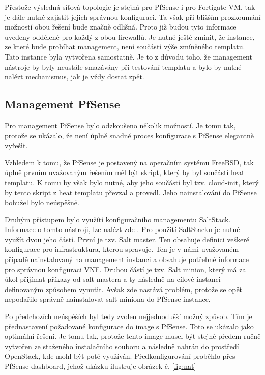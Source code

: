 Přestože výsledná síťová topologie je stejná pro PfSense i pro Fortigate VM, tak je dále nutné zajistit jejich správnou konfiguraci. Ta však při bližším prozkoumání možností obou řešení bude značně odlišná. Proto již budou tyto informace uvedeny odděleně pro každý z obou firewallů. Je nutné ještě zmínit, že instance, ze které bude probíhat management, není součástí výše zmíněného templatu. Tato instance byla vytvořena samostatně. Je to z důvodu toho, že management nástroje by byly neustále smazávány při testování templatu a bylo by nutné nalézt mechanismus, jak je vždy dostat zpět. 

\subsection{Management PfSense}\label{sub:interaction}

Pro management PfSense bylo odzkoušeno několik možností. Je tomu tak, protože se ukázalo, že není úplně snadné proces konfigurace s PfSense elegantně vyřešit. 

Vzhledem k tomu, že PfSense je postavený na operačním systému FreeBSD, tak úplně prvním uvažovaným řešením měl být skript, který by byl součástí heat templatu. K tomu by však bylo nutné, aby jeho součástí byl tzv. cloud-init, který by tento skript z heat templatu převzal a provedl. Jeho nainstalování do PfSense bohužel bylo neúspěšné. 

Druhým přístupem bylo využítí konfiguračního managementu SaltStack. Informace o tomto nástroji, lze nalézt zde \cite{salt}. Pro použití SaltStacku je nutné využít dvou jeho částí. První je tzv. Salt master. Ten obsahuje definici veškeré konfigurace pro infrastruktura, kterou spravuje. Ten je v námi uvažovaném případě nainstalovaný na management instanci a obsahuje potřebné informace pro správnou konfiguraci VNF. Druhou částí je tzv. Salt minion, který má za úkol přijímat příkazy od salt mastera a ty následně na cílové instanci definovaným způsobem vynutit. Avšak zde nastává problém, protože se opět nepodařilo správně nainstalovat salt miniona do PfSense instance.

Po předchozích neúspěších byl tedy zvolen nejjednodušší možný způsob. Tím je přednastavení požadované konfigurace do image s PfSense. Toto se ukázalo jako optimální řešení. Je tomu tak, protože tento image musel být stejně předem ručně vytvořen ze staženého instalačního souboru a následně nahrán do prostředí OpenStack, kde mohl být poté využíván. Předkonfigurování proběhlo přes PfSense dashboard, jehož ukázku ilustruje obrázek č. \ref{fig:nat}

